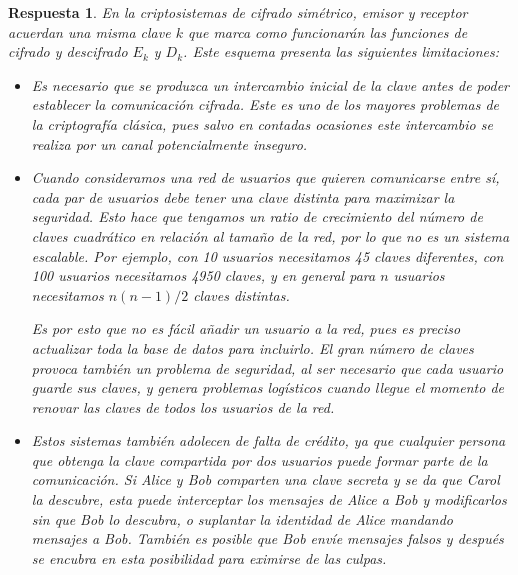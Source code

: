 \documentclass[
  a4paper,
  spanish,
  12pt,
]{scrartcl}
\theoremstyle{ejercicio-style}
\theoremstyle{remark-style}
\newtheorem*{sol}{Respuesta}
\theoremstyle{teorema-style}
\begin{document}
\begin{sol}
  En la criptosistemas de cifrado simétrico, emisor y receptor acuerdan una misma clave $k$ que marca como funcionarán las funciones de cifrado y descifrado $E_k$ y $D_k$. Este esquema presenta las siguientes limitaciones:

\begin{itemize}
\item Es necesario que se produzca un intercambio inicial de la clave antes de poder establecer la comunicación cifrada. Este es uno de los mayores problemas de la criptografía clásica, pues salvo en contadas ocasiones este intercambio se realiza por un canal potencialmente inseguro.


\item Cuando consideramos una red de usuarios que quieren comunicarse entre sí, cada par de usuarios debe tener una clave distinta para maximizar la seguridad. Esto hace que tengamos un ratio de crecimiento del número de claves cuadrático en relación al tamaño de la red, por lo que no es un sistema escalable. Por ejemplo, con 10 usuarios necesitamos 45 claves diferentes, con 100 usuarios necesitamos 4950 claves, y en general para $n$ usuarios necesitamos $n(n-1)/2$ claves distintas.

Es por esto que no es fácil añadir un usuario a la red, pues es preciso actualizar toda la base de datos para incluirlo. El gran número de claves provoca también un problema de seguridad, al ser necesario que cada usuario guarde sus claves, y genera problemas logísticos cuando llegue el momento de renovar las claves de todos los usuarios de la red.

\item Estos sistemas también adolecen de falta de crédito, ya que cualquier persona que obtenga la clave compartida por dos usuarios puede formar parte de la comunicación. Si Alice y Bob comparten una clave secreta y se da que Carol la descubre, esta puede interceptar los mensajes de Alice a Bob y modificarlos sin que Bob lo descubra, o suplantar la identidad de Alice mandando mensajes a Bob. También es posible que Bob envíe mensajes falsos y después se encubra en esta posibilidad para eximirse de las culpas.
\end{itemize}


\end{sol}
\end{document}
